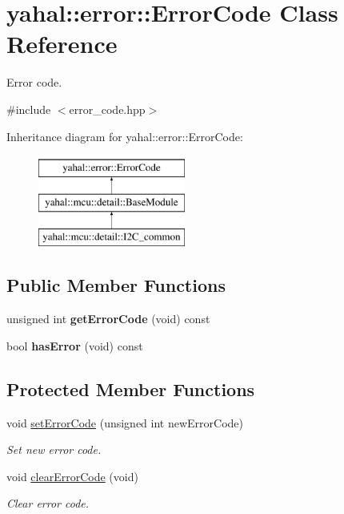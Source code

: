 \hypertarget{classyahal_1_1error_1_1_error_code}{}\section{yahal\+:\+:error\+:\+:Error\+Code Class Reference}
\label{classyahal_1_1error_1_1_error_code}


Error code.  




{\ttfamily \#include $<$error\+\_\+code.\+hpp$>$}

Inheritance diagram for yahal\+:\+:error\+:\+:Error\+Code\+:\begin{figure}[H]
\begin{center}
\leavevmode
\includegraphics[height=3.000000cm]{classyahal_1_1error_1_1_error_code}
\end{center}
\end{figure}
\subsection*{Public Member Functions}
\begin{DoxyCompactItemize}
\item 
\hypertarget{classyahal_1_1error_1_1_error_code_a8da8151a2788d474084d789337d97bae}{}unsigned int {\bfseries get\+Error\+Code} (void) const \label{classyahal_1_1error_1_1_error_code_a8da8151a2788d474084d789337d97bae}

\item 
\hypertarget{classyahal_1_1error_1_1_error_code_a2c92ad4dd5a16cd0f994fb14d35f2245}{}bool {\bfseries has\+Error} (void) const \label{classyahal_1_1error_1_1_error_code_a2c92ad4dd5a16cd0f994fb14d35f2245}

\end{DoxyCompactItemize}
\subsection*{Protected Member Functions}
\begin{DoxyCompactItemize}
\item 
void \hyperlink{classyahal_1_1error_1_1_error_code_acc2142f7c7fad8b06e9933611e8a5a31}{set\+Error\+Code} (unsigned int new\+Error\+Code)
\begin{DoxyCompactList}\small\item\em Set new error code. \end{DoxyCompactList}\item 
void \hyperlink{classyahal_1_1error_1_1_error_code_a6dcccae993641509661b2f92c702b714}{clear\+Error\+Code} (void)
\begin{DoxyCompactList}\small\item\em Clear error code. \end{DoxyCompactList}\end{DoxyCompactItemize}
